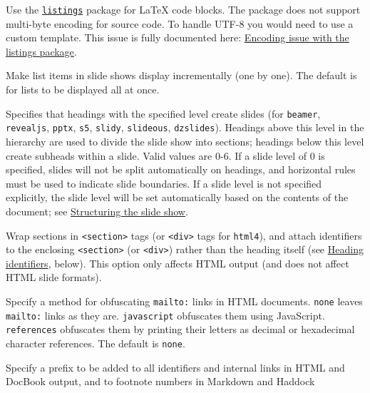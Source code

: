 \documentclass[
]{article}
\begin{document}
\begin{description}
Use the \href{https://ctan.org/pkg/listings}{\texttt{listings}} package
for LaTeX code blocks. The package does not support multi-byte encoding
for source code. To handle UTF-8 you would need to use a custom
template. This issue is fully documented here:
\href{https://en.wikibooks.org/wiki/LaTeX/Source_Code_Listings\#Encoding_issue}{Encoding
issue with the listings package}.
\item[\texttt{-i}, \texttt{-\/-incremental{[}=true\textbar{}false{]}}]
Make list items in slide shows display incrementally (one by one). The
default is for lists to be displayed all at once.
\item[\texttt{-\/-slide-level=}\emph{NUMBER}]
Specifies that headings with the specified level create slides (for
\texttt{beamer}, \texttt{revealjs}, \texttt{pptx}, \texttt{s5},
\texttt{slidy}, \texttt{slideous}, \texttt{dzslides}). Headings above
this level in the hierarchy are used to divide the slide show into
sections; headings below this level create subheads within a slide.
Valid values are 0-6. If a slide level of 0 is specified, slides will
not be split automatically on headings, and horizontal rules must be
used to indicate slide boundaries. If a slide level is not specified
explicitly, the slide level will be set automatically based on the
contents of the document; see
\protect\hyperlink{structuring-the-slide-show}{Structuring the slide
show}.
\item[\texttt{-\/-section-divs{[}=true\textbar{}false{]}}]
Wrap sections in \texttt{\textless{}section\textgreater{}} tags (or
\texttt{\textless{}div\textgreater{}} tags for \texttt{html4}), and
attach identifiers to the enclosing
\texttt{\textless{}section\textgreater{}} (or
\texttt{\textless{}div\textgreater{}}) rather than the heading itself
(see \protect\hyperlink{heading-identifiers}{Heading identifiers},
below). This option only affects HTML output (and does not affect HTML
slide formats).
\item[\texttt{-\/-email-obfuscation=none}\textbar{}\texttt{javascript}\textbar{}\texttt{references}]
Specify a method for obfuscating \texttt{mailto:} links in HTML
documents. \texttt{none} leaves \texttt{mailto:} links as they are.
\texttt{javascript} obfuscates them using JavaScript.
\texttt{references} obfuscates them by printing their letters as decimal
or hexadecimal character references. The default is \texttt{none}.
\item[\texttt{-\/-id-prefix=}\emph{STRING}]
Specify a prefix to be added to all identifiers and internal links in
HTML and DocBook output, and to footnote numbers in Markdown and Haddock

\end{description}
\end{document}
